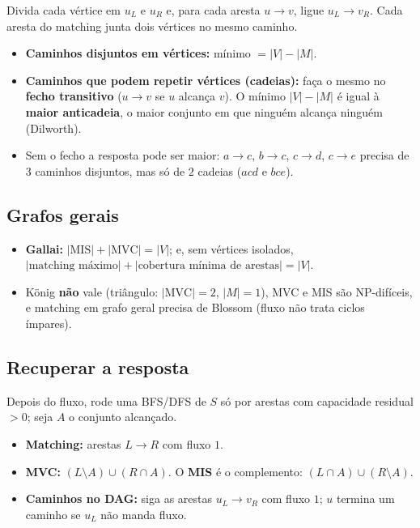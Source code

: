 Divida cada vértice em $u_L$ e $u_R$ e, para cada aresta $u \to v$, ligue $u_L \to v_R$. Cada aresta do matching
junta dois vértices no mesmo caminho.
\begin{itemize}
  \item \textbf{Caminhos disjuntos em vértices:} mínimo $= |V| - |M|$.
  \item \textbf{Caminhos que podem repetir vértices (cadeias):} faça o mesmo no \textbf{fecho transitivo}
        ($u \to v$ se $u$ alcança $v$). O mínimo $|V| - |M|$ é igual à \textbf{maior anticadeia}, o maior conjunto em
        que ninguém alcança ninguém (Dilworth).
  \item Sem o fecho a resposta pode ser maior: $a \to c$, $b \to c$, $c \to d$, $c \to e$ precisa de $3$ caminhos
        disjuntos, mas só de $2$ cadeias ($acd$ e $bce$).
\end{itemize}

\subsection*{Grafos gerais}

\begin{itemize}
  \item \textbf{Gallai:} $|\text{MIS}| + |\text{MVC}| = |V|$; e, sem vértices isolados,
        $|\text{matching máximo}| + |\text{cobertura mínima de arestas}| = |V|$.
  \item König \textbf{não} vale (triângulo: $|\text{MVC}| = 2$, $|M| = 1$), MVC e MIS são NP-difíceis, e matching
        em grafo geral precisa de Blossom (fluxo não trata ciclos ímpares).
\end{itemize}

\subsection*{Recuperar a resposta}

Depois do fluxo, rode uma BFS/DFS de $S$ só por arestas com capacidade residual $> 0$; seja $A$ o conjunto alcançado.
\begin{itemize}
  \item \textbf{Matching:} arestas $L \to R$ com fluxo $1$.
  \item \textbf{MVC:} $(L \setminus A) \cup (R \cap A)$. O \textbf{MIS} é o complemento: $(L \cap A) \cup (R \setminus A)$.
  \item \textbf{Caminhos no DAG:} siga as arestas $u_L \to v_R$ com fluxo $1$; $u$ termina um caminho se $u_L$ não manda fluxo.
\end{itemize}
